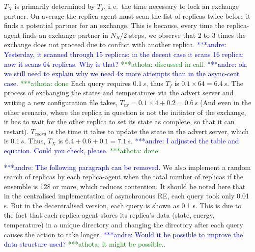 \documentclass{rspublic}
\newcommand{\alnote}[1]{ {\textcolor{blue} { ***andre: #1 }}}
\newcommand{\athotanote}[1]{ {\textcolor{green} { ***athota: #1 }}}
\newcommand{\alnote}[1]{}
\newcommand{\athotanote}[1]{}
\begin{document}
$T_{X}$ is primarily determined by $T_f$, i.\,e.\ the time necessary to lock
an exchange partner. On average the replica-agent must scan the list of 
replicas twice before it finds a potential partner for an exchange. This is because, every time the replica-agent finds an exchange partner in $N_R/2$ steps, we observe that 2 to 3 times the exchange does not proceed due to conflict with another replica. \alnote{Yesterday, it
scanned through 15 replicas; in the decent case it scans 16 replica; now
it scans 64 replicas. Why is that?} \athotanote{discussed in call.} \alnote{
ok, we still need to explain why we need 4x more attempts than in the
async-cent case.} \athotanote{done}
Each query requires $0.1\,s$, thus $T_f$ is $0.1\times64=6.4\,s$. The process of
exchanging the states and temperatures via the advert server and writing
a new configuration file takes, $T_{ex} = 0.1\times 4 +0.2 = 0.6\,s$ 
(And even in the other scenario, where the replica in question is 
not the initiator of the exchange, it has to wait for the other replica to set its state as
complete, so that it can restart). $T_{coord}$ is the time it takes to
update the state in the advert server, which is $0.1\,s$. 
Thus, $T_{X}$ is $6.4+0.6 +0.1= 7.1\,s$. 
\alnote{I adjusted the table and equation. Could you check, please.} \athotanote{done}


\alnote{The following paragraph can be removed.}
We also implement a random search of replicas by each replica-agent when the total 
number of replicas if the ensemble is 128 or more, which reduces contention. 
It should be noted here that in the centralised implementation of
asynchronous RE, each query took only 0.01 s. But in
the decentralised version, each query is shown as 0.1 s. This is due to the fact 
that each replica-agent stores its replica's data (state, energy, temperature) in 
a unique directory and changing the directory after each query 
causes the action to take longer.\alnote{Would it be possible to improve the
data structure used?}\athotanote{it might be possible..}
\end{document}
